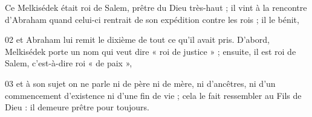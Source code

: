 Ce Melkisédek était roi de Salem, prêtre du Dieu très-haut ; il vint à la rencontre d’Abraham quand celui-ci rentrait de son expédition contre les rois ; il le bénit,

02 et Abraham lui remit le dixième de tout ce qu’il avait pris. D’abord, Melkisédek porte un nom qui veut dire « roi de justice » ; ensuite, il est roi de Salem, c’est-à-dire roi « de paix »,

03 et à son sujet on ne parle ni de père ni de mère, ni d’ancêtres, ni d’un commencement d’existence ni d’une fin de vie ; cela le fait ressembler au Fils de Dieu : il demeure prêtre pour toujours.

